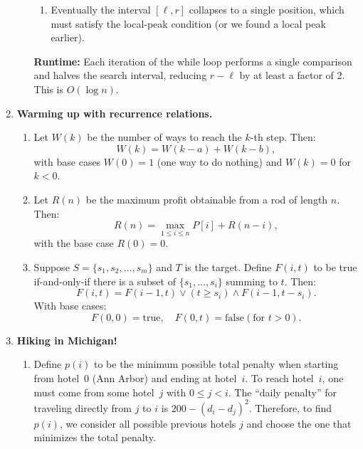 \documentclass{article}
\begin{document}
\begin{enumerate}
\begin{enumerate}
\begin{enumerate}
                \item Eventually the interval $[\ell, r]$ collapses to a single position, which must satisfy the local‐peak condition (or we found a local peak earlier).
            \end{enumerate}
            \textbf{Runtime:}
            Each iteration of the while loop performs a single comparison and halves the search interval, reducing $r - \ell$ by at least a factor of 2. This is $O(\log n)$.
    \end{enumerate}
    \pagebreak

    \item \textbf{Warming up with recurrence relations.} \\
    \begin{enumerate}
        \item Let $W(k)$ be the number of ways to reach the $k$-th step. Then:
        \[
        W(k) = W(k - a)  +  W(k - b),
        \]
        with base cases $W(0) = 1$ (one way to do nothing) and $W(k) = 0$ for $k < 0$. \\
        \item Let $R(n)$ be the maximum profit obtainable from a rod of length $n$. Then:
        \[
        R(n) = \max_{1  \le  i  \le  n}
        P[i] + R(n - i),
        \]
        with the base case $R(0) = 0$. \\ 
        \item Suppose $S = \{s_1, s_2, \ldots, s_m\}$ and $T$ is the target. Define $F(i,t)$ to be true if-and-only-if there is a subset of $\{s_1,\ldots,s_i\}$ summing to $t$. Then:
        \[
        F(i,t) = F(i-1,t) \lor  (t \ge s_i)  \wedge  F(i-1,t - s_i).
        \]
        With base cases:
        \[
        F(0,0) = \text{true}, \quad F(0,t) = \text{false}   (\text{for } t>0).
        \]
    \end{enumerate}



    \item \textbf{Hiking in Michigan!} \\
    \begin{enumerate}
        \item Define $p(i)$ to be the minimum possible total penalty when starting from hotel~0 (Ann Arbor) and ending at hotel~$i$. To reach hotel~$i$, one must come from some hotel~$j$ with $0 \le j < i$. The ``daily penalty'' for traveling directly from $j$ to $i$ is $200 - (d_i - d_j)^2$. Therefore, to find $p(i)$, we consider all possible previous hotels $j$ and choose the one that minimizes the total penalty.


\end{enumerate}
\end{enumerate}
\end{document}
